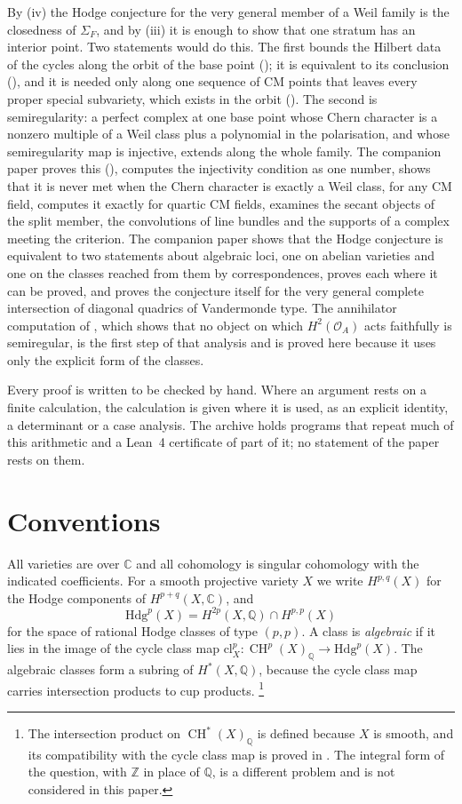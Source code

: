 \documentclass[11pt,reqno]{amsart}
\theoremstyle{plain}
\theoremstyle{definition}
\theoremstyle{remark}
\newcommand{\QQ}{\mathbb{Q}}
\newcommand{\ZZ}{\mathbb{Z}}
\newcommand{\CC}{\mathbb{C}}
\newcommand{\cO}{\mathcal{O}}
\newcommand{\Hdg}{\mathrm{Hdg}}
\newcommand{\cl}{\mathrm{cl}}
\DeclareMathOperator{\CH}{CH}
\begin{document}
By (iv) the Hodge conjecture for the very general member of a
Weil family is the closedness of $\Sigma_{F}$, and by (iii) it is enough to
show that one stratum has an interior point. Two statements would do this.
The first bounds the Hilbert data of the cycles along the orbit of the base
point (); it is equivalent to its conclusion
(), and it is needed only along one sequence of CM
points that leaves every proper special subvariety, which exists in the
orbit (). The second is semiregularity: a perfect complex
at one base point whose Chern character is a nonzero multiple of a Weil
class plus a polynomial in the polarisation, and whose semiregularity map is
injective, extends along the whole family. The companion paper
\cite{paperII} proves this (\cite[Theorem~2.3]{paperII}), computes the
injectivity condition as one number, shows that it is never met when the
Chern character is exactly a Weil class, for any CM field, computes it
exactly for quartic CM fields, examines the secant objects of the split
member, the convolutions of line bundles and the supports of a complex
meeting the criterion. The companion paper \cite{paperIII} shows that the
Hodge conjecture is equivalent to two statements about algebraic loci, one on
abelian varieties and one on the classes reached from them by
correspondences, proves each where it can be proved, and proves the
conjecture itself for the very general complete intersection of diagonal
quadrics of Vandermonde type. The annihilator computation of
, which shows that no object on which $H^{2}(\cO_{A})$ acts
faithfully is semiregular, is the first step of that analysis and is proved
here because it uses only the explicit form of the classes.

Every proof is written to be checked by hand. Where an argument rests on a
finite calculation, the calculation is given where it is used, as an explicit
identity, a determinant or a case analysis. The archive \cite{BMB26} holds
programs that repeat much of this arithmetic and a Lean~4 certificate of
part of it; no statement of the paper rests on them.
\section{Conventions}\label{sec:conventions}
\enlargethispage{3pt}

All varieties are over $\CC$ and all cohomology is singular cohomology with
the indicated coefficients. For a smooth projective variety $X$ we write
$H^{p,q}(X)$ for the Hodge components of $H^{p+q}(X,\CC)$, and
\[
  \Hdg^{p}(X)=H^{2p}(X,\QQ)\cap H^{p,p}(X)
\]
for the space of rational Hodge classes of type $(p,p)$. A class is
\emph{algebraic} if it lies in the image of the cycle class map
$\cl^{p}_{X}\colon\CH^{p}(X)_{\QQ}\to\Hdg^{p}(X)$. The algebraic classes form
a subring of $H^{*}(X,\QQ)$, because the cycle class map carries intersection
products to cup products.%
\footnote{The intersection product on $\CH^{*}(X)_{\QQ}$ is defined because
$X$ is smooth, and its compatibility with the cycle class map is proved in
\cite[Chapter~19]{Ful98}. The integral form of the question, with $\ZZ$ in
place of $\QQ$, is a different problem and is not considered in this paper.}
\end{document}

